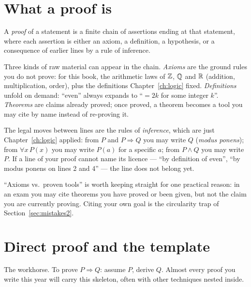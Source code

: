\section{What a proof is}\label{sec:whatproof}

\begin{definition}[Proof]
A \emph{proof} of a statement is a finite chain of assertions ending at that
statement, where each assertion is either an axiom, a definition, a hypothesis,
or a consequence of earlier lines by a rule of inference.
\end{definition}

Three kinds of raw material can appear in the chain.
\emph{Axioms} are the ground rules you do not prove: for this book,
the arithmetic laws of $\mathbb{Z}$, $\mathbb{Q}$ and $\mathbb{R}$ (addition, multiplication, order),
plus the definitions Chapter~\ref{ch:logic} fixed. \emph{Definitions} unfold on
demand: ``even'' always expands to ``$=2k$ for some integer $k$''.
\emph{Theorems} are claims already proved; once proved, a theorem
becomes a tool you may cite by name instead of re-proving it.

The legal moves between lines are the rules of \emph{inference}, which are just
Chapter~\ref{ch:logic} applied: from $P$ and $P \Rightarrow Q$ you may write $Q$
(\emph{modus ponens}); from $\forall x\,P(x)$ you may write
$P(a)$ for a specific $a$; from $P \land Q$ you may write $P$. If a line of your
proof cannot name its licence --- ``by definition of even'', ``by modus ponens on
lines 2 and 4'' --- the line does not belong yet.

\begin{remark}
``Axioms vs.\ proven tools'' is worth keeping straight for one practical reason:
in an exam you may cite theorems you have proved or been given, but not the
claim you are currently proving. Citing your own goal is the circularity trap
of Section~\ref{sec:mistakes2}.
\end{remark}

\section{Direct proof and the template}\label{sec:direct}

The workhorse. To prove $P \Rightarrow Q$: assume $P$, derive $Q$. Almost every
proof you write this year will carry this skeleton, often with other techniques
nested inside.

